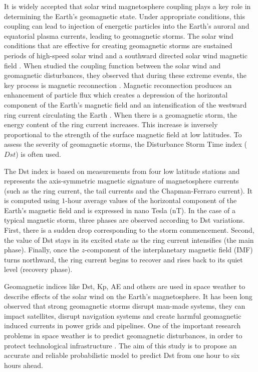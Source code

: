 It is widely accepted that solar wind magnetosphere coupling plays a key role in determining the 
Earth’s geomagnetic state. Under appropriate conditions, this coupling can lead to injection of 
energetic particles into the Earth’s auroral and equatorial plasma currents, leading to geomagnetic 
storms. The solar wind conditions that are effective for creating geomagnetic storms are sustained 
periods of high-speed solar wind and a southward directed solar wind magnetic field 
\citep{JGR:JGR10260}. When \citet{1981AkasofuE} studied the coupling function between the solar 
wind and geomagnetic disturbances, they observed that during these extreme events, the key process 
is magnetic reconnection \citep{magneticreconnection}. Magnetic reconnection produces an 
enhancement of particle flux which creates a depression of the horizontal component of the Earth’s 
magnetic field and an intensification of the westward ring current circulating the Earth 
\citep{JGRA:JGRA11775}. When there is a geomagnetic storm, the energy content of the ring current 
increases. This increase is inversely proportional to the strength of the surface magnetic field at 
low latitudes. To assess the severity of geomagnetic storms, the Disturbance Storm Time index 
($Dst$) is often used. 

The Dst index \citep{Sugiura1964} is based on measurements from four low latitude stations and 
represents the axis-symmetric magnetic signature of magnetosphere currents (such as the ring current, 
the tail currents and the Chapman-Ferraro current). It is computed using $1$-hour average values of the 
horizontal component of the Earth’s magnetic field and is expressed in nano Tesla (nT). In the case of a 
typical magnetic storm, three phases are observed according to Dst variations. First, there is a sudden drop 
corresponding to the storm commencement. Second, the value of Dst stays in its excited state as the ring current 
intensifies (the main phase). Finally, once the $z$-component of the interplanetary magnetic field (IMF) turns 
northward, the ring current begins to recover and rises back to its quiet level (recovery phase). 

Geomagnetic indices like Dst, Kp, AE and others are used in space weather to describe effects of the solar wind on 
the Earth's magnetosphere. It has been long observed that strong geomagnetic storms disrupt man-made systems, 
they can impact satellites, disrupt navigation systems and create harmful geomagnetic induced currents in power grids 
and pipelines. One of the important research problems in space weather is to predict geomagnetic disturbances, 
in order to protect technological infrastructure \citep{Singh2010}. The aim of this study is to propose an 
accurate and reliable probabilistic model to predict Dst from one hour to six hours ahead. 

